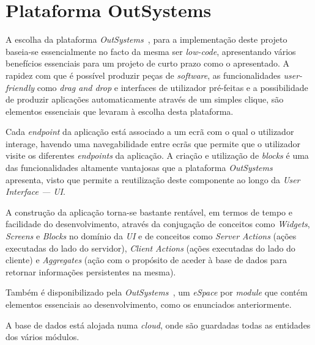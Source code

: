 \section{Plataforma OutSystems}\label{sec:plataformaOutSystems}

A escolha da plataforma \textit{OutSystems~\cite{outsystems}}, para a implementação deste projeto baseia-se essencialmente no facto da mesma ser \textit{low-code},
apresentando vários benefícios essenciais para um projeto de curto prazo como o apresentado. A rapidez
com que é possível produzir peças de \textit{software}, as funcionalidades \textit{user-friendly} como \textit{drag and drop} e 
interfaces de utilizador pré-feitas e a possibilidade de produzir aplicações automaticamente através de
um simples clique, são elementos essenciais que levaram à escolha desta plataforma. 
\par
Cada \textit{endpoint} da aplicação está associado a um ecrã com o qual o utilizador interage, havendo uma navegabilidade entre ecrãs que permite que o utilizador visite os diferentes \textit{endpoints} da aplicação.
A criação e utilização de \textit{blocks} é uma das funcionalidades altamente vantajosas que a plataforma \textit{OutSystems~\cite{outsystems}} apresenta, 
visto que permite a reutilização deste componente ao longo da \textit{User Interface --- UI}.
\par
A construção da aplicação torna-se bastante rentável, em termos de tempo e facilidade do desenvolvimento, 
através da conjugação de conceitos como \textit{Widgets}, \textit{Screens} e \textit{Blocks} no domínio da  \textit{UI} 
e de conceitos como \textit{Server Actions} (ações executadas do lado do servidor), \textit{Client Actions} (ações executadas do lado do cliente) 
e \textit{Aggregates} (ação com o propósito de aceder à base de dados para retornar informações persistentes na mesma).
\par
Também é disponibilizado pela \textit{OutSystems~\cite{outsystems}}, um \textit{eSpace} por \textit{module} que contém elementos essenciais 
ao desenvolvimento, como os enunciados anteriormente.
\par
A base de dados está alojada numa \textit{cloud}, onde são guardadas todas as entidades dos vários módulos.
